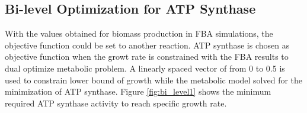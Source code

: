 \begin{table}[H]
\caption[Producing and consuming reaction fluxes for the metabolite oxaloacetate (OXA).]{Producing and consuming reaction fluxes for the metabolite oxaloacetate (OXA).}
\vspace{0.2cm}
\setlength{\tabcolsep}{4pt}
\label{table:12OXA}
\end{table}


\subsection{Bi-level Optimization for ATP Synthase}
With the values obtained for biomass production in FBA simulations, the objective function could be set to another reaction. ATP synthase is chosen as objective function when the growt rate is constrained with the FBA results to dual optimize metabolic problem. A linearly spaced vector of from 0 to 0.5 is used to constrain lower bound of growth while the metabolic model solved for the minimization of ATP synthase. Figure \ref{fig:bi_level1} shows the minimum required ATP synthase activity to reach specific growth rate.


